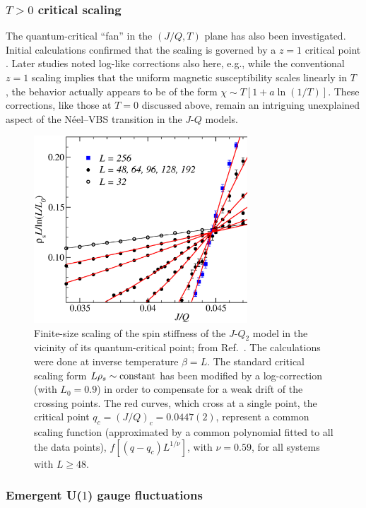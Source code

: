 \documentclass[10pt,pre,aps,twocolumn,showpacs,superscriptaddress,floatfix]{revtex4-1}
\begin{document}
\subsubsection{$T>0$ critical scaling} The quantum-critical ``fan'' in the $(J/Q,T)$ plane has also been investigated. Initial calculations confirmed that
the scaling is governed by a $z=1$ critical point \cite{melko2008:jq}. Later studies \cite{Sandvik10c,Sandvik11a} noted log-like corrections also here, e.g., 
while the conventional $z=1$ scaling implies that the uniform magnetic susceptibility scales linearly in $T$ \cite{Chakravarty89}, the behavior actually appears 
to be of the form $\chi \sim T[1+a\ln(1/T)]$. These corrections, like those at $T=0$ discussed above, remain an intriguing unexplained aspect of the N\'eel--VBS 
transition in the $J$-$Q$ models.

\begin{figure}
\includegraphics[width=8cm, clip]{fig04.eps}
\caption{Finite-size scaling of the spin stiffness of the $J$-$Q_2$ model in the vicinity of its quantum-critical point; from Ref.~\cite{Sandvik10c}. The 
calculations were done at inverse temperature $\beta=L$. The standard critical scaling form $L\rho_s \sim {\rm constant}$ has been modified by a log-correction 
(with $L_0=0.9$) in order to compensate for a weak drift of the crossing points. The red curves, which cross at a single point, the critical point $q_c=(J/Q)_c = 0.0447(2)$, 
represent a common scaling function (approximated by a common polynomial fitted to all the data points), $f[(q-q_c)L^{1/\nu}]$, with $\nu=0.59$, for all systems 
with $L\ge 48$.}
\label{jqrhos}
\end{figure}

\subsubsection{Emergent U($1$) gauge fluctuations}
\end{document}
